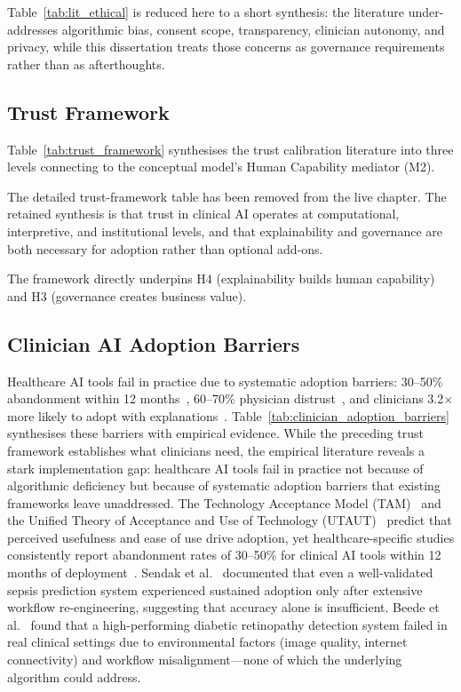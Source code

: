 Table~\ref{tab:lit_ethical} is reduced here to a short synthesis: the literature under-addresses algorithmic bias, consent scope, transparency, clinician autonomy, and privacy, while this dissertation treats those concerns as governance requirements rather than as afterthoughts.

\subsection{Trust Framework}

Table~\ref{tab:trust_framework} synthesises the trust calibration literature into three levels connecting to the conceptual model's Human Capability mediator (M2).

The detailed trust-framework table has been removed from the live chapter. The retained synthesis is that trust in clinical AI operates at computational, interpretive, and institutional levels, and that explainability and governance are both necessary for adoption rather than optional add-ons.


The framework directly underpins H4 (explainability builds human capability) and H3 (governance creates business value).

\subsection{Clinician AI Adoption Barriers}

Healthcare AI tools fail in practice due to systematic adoption barriers: 30--50\% abandonment within 12 months~\cite{sendak2020healthcare, beede2020human}, 60--70\% physician distrust~\cite{asan2020artificial}, and clinicians 3.2$\times$ more likely to adopt with explanations~\cite{tonekaboni2019clinicians}. Table~\ref{tab:clinician_adoption_barriers} synthesises these barriers with empirical evidence.
\iffalse %
While the preceding trust framework establishes what clinicians need, the empirical literature reveals a stark implementation gap: healthcare AI tools fail in practice not because of algorithmic deficiency but because of systematic adoption barriers that existing frameworks leave unaddressed. The Technology Acceptance Model (TAM)~\cite{davis1989tam} and the Unified Theory of Acceptance and Use of Technology (UTAUT)~\cite{venkatesh2003utaut} predict that perceived usefulness and ease of use drive adoption, yet healthcare-specific studies consistently report abandonment rates of 30--50\% for clinical AI tools within 12 months of deployment~\cite{sendak2020healthcare, beede2020human}. Sendak et al.~\cite{sendak2020healthcare} documented that even a well-validated sepsis prediction system experienced sustained adoption only after extensive workflow re-engineering, suggesting that accuracy alone is insufficient. Beede et al.~\cite{beede2020human} found that a high-performing diabetic retinopathy detection system failed in real clinical settings due to environmental factors (image quality, internet connectivity) and workflow misalignment---none of which the underlying algorithm could address.

